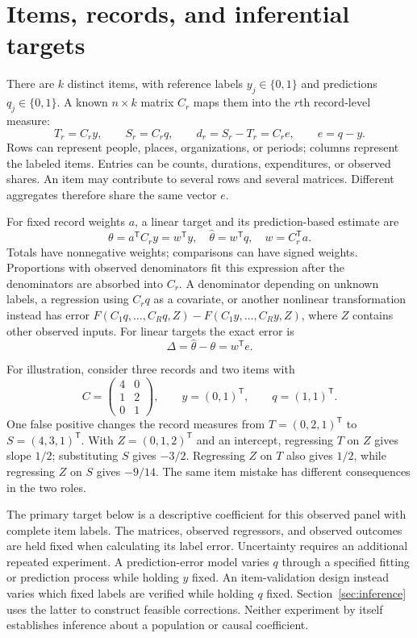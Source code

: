 \section{Items, records, and inferential targets}\label{sec:estimand}
There are $k$ distinct items, with reference labels $y_j\in\{0,1\}$ and
predictions $q_j\in\{0,1\}$. A known $n\times k$ matrix $C_r$ maps them into
the $r$th record-level measure:
\[
T_r=C_ry,\qquad S_r=C_rq,\qquad d_r=S_r-T_r=C_re,\qquad e=q-y.
\]
Rows can represent people, places, organizations, or periods; columns
represent the labeled items. Entries can be counts, durations, expenditures,
or observed shares. An item may contribute to several rows and several
matrices. Different aggregates therefore share the same vector $e$.

For fixed record weights $a$, a linear target and its prediction-based
estimate are
\begin{equation}\label{eq:estimand}
\theta=a^{\mathsf T}C_ry=w^{\mathsf T}y,\quad
\widehat\theta=w^{\mathsf T}q,\quad w=C_r^{\mathsf T}a.
\end{equation}
Totals have nonnegative weights; comparisons can have signed weights.
Proportions with observed denominators fit this expression after the
denominators are absorbed into $C_r$. A denominator depending on unknown
labels, a regression using $C_rq$ as a covariate, or another nonlinear
transformation instead has error $F(C_1q,\ldots,C_Rq,Z)-F(C_1y,\ldots,C_Ry,Z)$,
where $Z$ contains other observed inputs. For linear targets the exact error is
\begin{equation}\label{eq:contrast}
\Delta=\widehat\theta-\theta=w^{\mathsf T}e.
\end{equation}

For illustration, consider three records and two items with
\[
C=\begin{pmatrix}4&0\\1&2\\0&1\end{pmatrix},\qquad
y=(0,1)^{\mathsf T},\qquad q=(1,1)^{\mathsf T}.
\]
One false positive changes the record measures from $T=(0,2,1)^{\mathsf T}$
to $S=(4,3,1)^{\mathsf T}$. With $Z=(0,1,2)^{\mathsf T}$ and an intercept,
regressing $T$ on $Z$ gives slope $1/2$; substituting $S$ gives $-3/2$.
Regressing $Z$ on $T$ also gives $1/2$, while regressing $Z$ on $S$ gives
$-9/14$. The same item mistake has different consequences in the two roles.

The primary target below is a descriptive coefficient for this observed
panel with complete item labels. The matrices, observed regressors, and
observed outcomes are held fixed when calculating its label error.
Uncertainty requires an additional repeated experiment. A prediction-error
model varies $q$ through a specified fitting or prediction process while
holding $y$ fixed. An item-validation design instead varies which fixed
labels are verified while holding $q$ fixed. Section~\ref{sec:inference}
uses the latter to construct feasible corrections. Neither experiment by
itself establishes inference about a population or causal coefficient.

